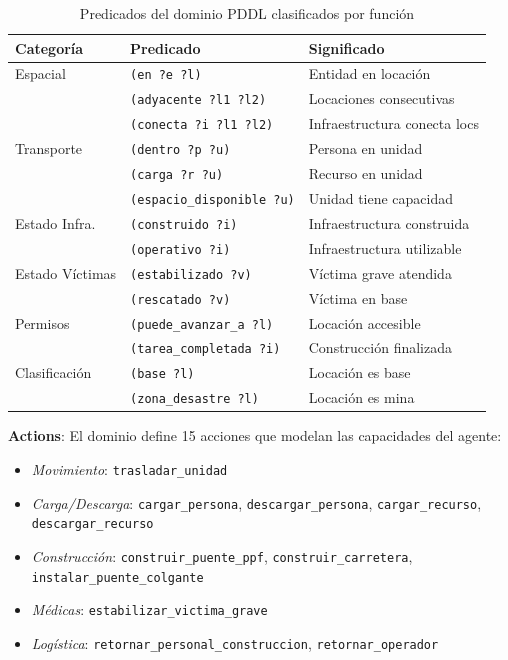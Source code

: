 \documentclass[conference]{IEEEtran}
\begin{document}
    \begin{table}[htbp]
    \caption{Predicados del dominio PDDL clasificados por función}
    \label{tab:predicados}
    \centering
    \scriptsize
    \begin{tabular}{@{}lll@{}}
    \toprule
    \textbf{Categoría} & \textbf{Predicado} & \textbf{Significado} \\
    \midrule
    Espacial & \texttt{(en ?e ?l)} & Entidad en locación \\
    & \texttt{(adyacente ?l1 ?l2)} & Locaciones consecutivas \\
    & \texttt{(conecta ?i ?l1 ?l2)} & Infraestructura conecta locs \\
    \midrule
    Transporte & \texttt{(dentro ?p ?u)} & Persona en unidad \\
    & \texttt{(carga ?r ?u)} & Recurso en unidad \\
    & \texttt{(espacio\_disponible ?u)} & Unidad tiene capacidad \\
    \midrule
    Estado Infra. & \texttt{(construido ?i)} & Infraestructura construida \\
    & \texttt{(operativo ?i)} & Infraestructura utilizable \\
    \midrule
    Estado Víctimas & \texttt{(estabilizado ?v)} & Víctima grave atendida \\
    & \texttt{(rescatado ?v)} & Víctima en base \\
    \midrule
    Permisos & \texttt{(puede\_avanzar\_a ?l)} & Locación accesible \\
    & \texttt{(tarea\_completada ?i)} & Construcción finalizada \\
    \midrule
    Clasificación & \texttt{(base ?l)} & Locación es base \\
    & \texttt{(zona\_desastre ?l)} & Locación es mina \\
    \bottomrule
    \end{tabular}
    \end{table}

    \textbf{Actions}: El dominio define 15 acciones que modelan las capacidades del agente:

    \begin{itemize}[leftmargin=*,itemsep=1pt]
    \item \textit{Movimiento}: \texttt{trasladar\_unidad}
    \item \textit{Carga/Descarga}: \texttt{cargar\_persona}, \texttt{descargar\_persona}, \texttt{cargar\_recurso}, \texttt{descargar\_recurso}
    \item \textit{Construcción}: \texttt{construir\_puente\_ppf}, \texttt{construir\_carretera}, \texttt{instalar\_puente\_colgante}
    \item \textit{Médicas}: \texttt{estabilizar\_victima\_grave}
    \item \textit{Logística}: \texttt{retornar\_personal\_construccion}, \texttt{retornar\_operador}
    \end{itemize}
\end{document}
